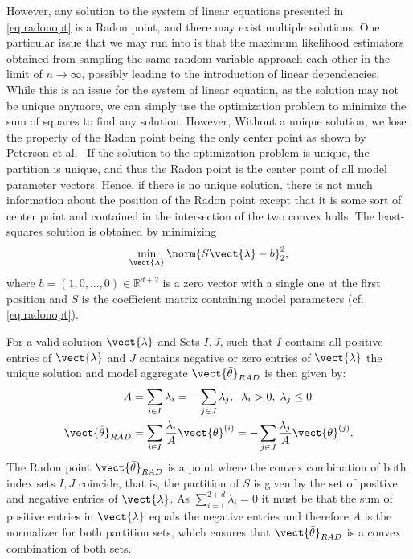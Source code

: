 However, any solution to the system of linear equations presented in \autoref{eq:radonopt} is a Radon point, and there may exist multiple solutions.
One particular issue that we may run into is that the maximum likelihood estimators obtained from sampling the same random variable approach each other in the limit of $n \rightarrow \infty$, possibly leading to the introduction of linear dependencies.
While this is an issue for the system of linear equation, as the solution may not be unique anymore, we can simply use the optimization problem to minimize the sum of squares to find any solution.
However, Without a unique solution, we lose the property of the Radon point being the only center point as shown by Peterson et al.~\cite{peterson1972geometry}
If the solution to the optimization problem is unique, the partition is unique, and thus the Radon point is the center point of all model parameter vectors.
Hence, if there is no unique solution, there is not much information about the position of the Radon point except that it is some sort of center point and contained in the intersection of the two convex hulls.
The least-squares solution is obtained by minimizing
\begin{equation}
    \label{eq:lstsq}
        \min_{\vect{\lambda}} \norm{S\vect{\lambda} - b}^2_2,
\end{equation}
where $b=(1, 0, \ldots, 0) \in \mathbb{R}^{d+2}$ is a zero vector with a single one at the first position and $S$ is the coefficient matrix containing model parameters (cf. \autoref{eq:radonopt}).

For a valid solution $\vect{\lambda}$ and Sets $I,J$, such that $I$ contains all positive entries of $\vect{\lambda}$ and $J$ contains negative or zero entries of $\vect{\lambda}$ the unique solution and model aggregate $\vect{\bar{\theta}}_{RAD}$ is then given by:
\begin{equation}
    \label{eq:radonpoint}
    \begin{split}
    A &= \sum_{i\in I} \lambda_i = - \sum_{j\in J} \lambda_j, \; \;\lambda_i > 0, \; \lambda_j \leq 0 \\
    \vect{\bar{\theta}}_{RAD} &= \sum_{i\in I} \frac{\lambda_i}{A} \vect{\theta}^{(i)} = - \sum_{j\in J} \frac{\lambda_j}{A} \vect{\theta}^{(j)}.
    \end{split}
\end{equation}
The Radon point $\vect{\bar{\theta}}_{RAD}$ is a point where the convex combination of both index sets $I, J$ coincide, that is, the partition of $S$ is given by the set of positive and negative entries of $\vect{\lambda}$.
As $\sum_{i=1}^{2+d} \lambda_i = 0$ it must be that the sum of positive entries in $\vect{\lambda}$ equals the negative entries and therefore $A$ is the normalizer for both partition sets, which ensures that $\vect{\bar{\theta}}_{RAD}$ is a convex combination of both sets.

